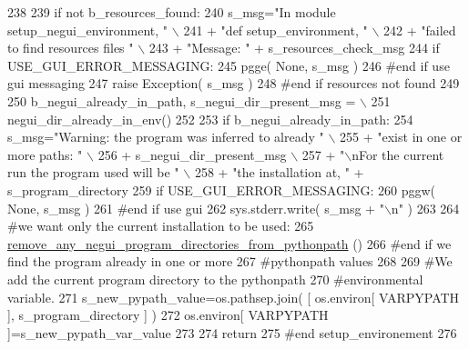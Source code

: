 \begin{DoxyCode}
238 
239     \textcolor{keywordflow}{if} \textcolor{keywordflow}{not} b\_resources\_found:
240         s\_msg=\textcolor{stringliteral}{"In module setup\_negui\_environment, "} \(\backslash\)
241                         + \textcolor{stringliteral}{"def setup\_environment, "} \(\backslash\)
242                         + \textcolor{stringliteral}{"failed to find resources files "} \(\backslash\)
243                         + \textcolor{stringliteral}{"Message: "} +  s\_resources\_check\_msg 
244         \textcolor{keywordflow}{if} USE\_GUI\_ERROR\_MESSAGING:
245             pgge( \textcolor{keywordtype}{None}, s\_msg )
246         \textcolor{comment}{#end if use gui messaging}
247         \textcolor{keywordflow}{raise} Exception( s\_msg )
248     \textcolor{comment}{#end if resources not found}
249 
250     b\_negui\_already\_in\_path, s\_negui\_dir\_present\_msg = \(\backslash\)
251                     negui\_dir\_already\_in\_env()
252 
253     \textcolor{keywordflow}{if} b\_negui\_already\_in\_path:
254         s\_msg=\textcolor{stringliteral}{"Warning: the program was inferred to already "} \(\backslash\)
255                         + \textcolor{stringliteral}{"exist in one or more paths: "} \(\backslash\)
256                         + s\_negui\_dir\_present\_msg \(\backslash\)
257                         + \textcolor{stringliteral}{"\(\backslash\)nFor the current run the program used will be "} \(\backslash\)
258                         + \textcolor{stringliteral}{"the installation at, "}  + s\_program\_directory
259         \textcolor{keywordflow}{if} USE\_GUI\_ERROR\_MESSAGING:
260             pggw( \textcolor{keywordtype}{None}, s\_msg )
261         \textcolor{comment}{#end if use gui}
262         sys.stderr.write( s\_msg + \textcolor{stringliteral}{"\(\backslash\)n"} )
263 
264         \textcolor{comment}{#we want only the current installation to be used:}
265         \hyperlink{namespacenegui_1_1setup__negui__environment_aaedbf956380dc5707c61769abf071c40}{remove\_any\_negui\_program\_directories\_from\_pythonpath}
      ()
266     \textcolor{comment}{#end if we find the program already in one or more}
267     \textcolor{comment}{#pythonpath values}
268 
269     \textcolor{comment}{#We add the current program directory to the pythonpath}
270     \textcolor{comment}{#environmental variable.}
271     s\_new\_pypath\_value=os.pathsep.join( [ os.environ[ VARPYPATH ], s\_program\_directory ] )
272     os.environ[ VARPYPATH ]=s\_new\_pypath\_var\_value
273         
274     \textcolor{keywordflow}{return} 
275 \textcolor{comment}{#end setup\_environement}
276 
\end{DoxyCode}
